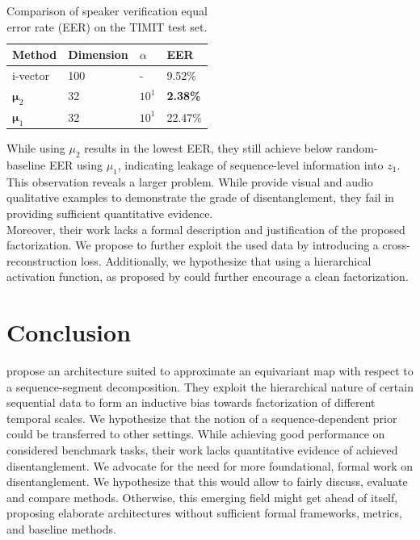 \documentclass{article} %
\begin{document}
\begin{table}[t]
	\caption{Comparison of speaker verification equal error rate (EER) on the TIMIT test set.}
	\label{tab:eer}
	\centering
	\begin{tabular}{llll}
		\toprule
		Method 				& Dimension 	& $\alpha$ 		& EER  				 \\
		\midrule\midrule
		\multirow{1}{*}{i-vector}
		& 100   & -     & 9.52\%    \\
		\midrule
		\multirow{1}{*}{$\bm{\mu}_2$}  	& 32			& $10^1$	& \textbf{2.38\%}  	 	\\
		\midrule
		\multirow{1}{*}{$\bm{\mu}_1$}
	& 32			& $10^1$		& 22.47\%   	\\
		\bottomrule
	\end{tabular}
\end{table}
While using $\mu_2$ results in the lowest EER, they still achieve below random-baseline EER using $\mu_1$, indicating leakage of sequence-level information into $z_1$.\\
This observation reveals a larger problem. While \citet{hsu2017unsupervised} provide visual and audio qualitative examples to demonstrate the grade of disentanglement, they fail in providing sufficient quantitative evidence.\\
Moreover, their work lacks a formal description and justification of the proposed factorization. We propose to further exploit the used data by introducing a cross-reconstruction loss.
Additionally, we hypothesize that using a hierarchical activation function, as proposed by \citet{shen2018ordered} could further encourage a clean factorization.




\section*{Conclusion}
\citet{hsu2017unsupervised} propose an architecture suited to approximate an equivariant map with respect to a sequence-segment decomposition. They exploit the hierarchical nature of certain sequential data to form an inductive bias towards factorization of different temporal scales. We hypothesize that the notion of a sequence-dependent prior could be transferred to other settings. While achieving good performance on considered benchmark tasks, their work lacks quantitative evidence of achieved disentanglement.
We advocate for the need for more foundational, formal work on disentanglement. We hypothesize that this would allow to fairly discuss, evaluate and compare methods. Otherwise, this emerging field might get ahead of itself, proposing elaborate architectures without sufficient formal frameworks, metrics, and baseline methods. 



\newpage


\end{document}
